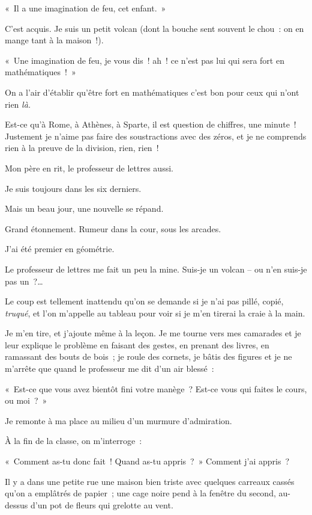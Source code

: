 \documentclass[french,twoside]{book} %
\begin{document}
\noindent « Il a une imagination de feu, cet enfant. »\par
C’est acquis. Je suis un petit volcan (dont la bouche sent souvent le chou : on en mange tant à la maison !).\par
\bigbreak
\noindent « Une imagination de feu, je vous dis ! ah ! ce n’est pas lui qui sera fort en mathématiques ! »\par
\bigbreak
\noindent On a l’air d’établir qu’être fort en mathématiques c’est bon pour ceux qui n’ont rien \emph{là.}\par
Est-ce qu’à Rome, à Athènes, à Sparte, il est question de chiffres, une minute ! Justement je n’aime pas faire des soustractions avec des zéros, et je ne comprends rien à la preuve de la division, rien, rien !\par
Mon père en rit, le professeur de lettres aussi.\par
Je suis toujours dans les six derniers.\par
Mais un beau jour, une nouvelle se répand.\par
Grand étonnement. Rumeur dans la cour, sous les arcades.\par
J’ai été premier en géométrie.\par
Le professeur de lettres me fait un peu la mine. Suis-je un volcan – ou n’en suis-je pas un ?…\par
Le coup est tellement inattendu qu’on se demande si je n’ai pas pillé, copié, \emph{truqué}, et l’on m’appelle au tableau pour voir si je m’en tirerai la craie à la main.\par
Je m’en tire, et j’ajoute même à la leçon. Je me tourne vers mes camarades et je leur explique le problème en faisant des gestes, en prenant des livres, en ramassant des bouts de bois ; je roule des cornets, je bâtis des figures et je ne m’arrête que quand le professeur me dit d’un air blessé :\par
« Est-ce que vous avez bientôt fini votre manège ? Est-ce vous qui faites le cours, ou moi ? »\par
Je remonte à ma place au milieu d’un murmure d’admiration.\par
À la fin de la classe, on m’interroge :\par
« Comment as-tu donc fait ! Quand as-tu appris ? » Comment j’ai appris ?\par
\bigbreak
\noindent Il y a dans une petite rue une maison bien triste avec quelques carreaux cassés qu’on a emplâtrés de papier ; une cage noire pend à la fenêtre du second, au-dessus d’un pot de fleurs qui grelotte au vent.\par
\end{document}

